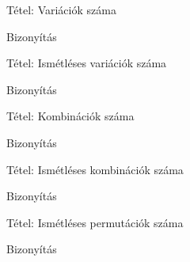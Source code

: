 \documentclass{beamer}
\begin{document}
\begin{frame}

\begin{block}{Tétel: Variációk száma}
\end{block}

\begin{block}{Bizonyítás}
\end{block}

\end{frame}

\begin{frame}

\begin{block}{Tétel: Ismétléses variációk száma}
\end{block}

\begin{block}{Bizonyítás}
\end{block}

\end{frame}

\begin{frame}

\begin{block}{Tétel: Kombinációk száma}
\end{block}

\begin{block}{Bizonyítás}
\end{block}

\end{frame}

\begin{frame}

\begin{block}{Tétel: Ismétléses kombinációk száma}
\end{block}

\begin{block}{Bizonyítás}
\end{block}

\end{frame}

\begin{frame}

\begin{block}{Tétel: Ismétléses permutációk száma}
\end{block}

\begin{block}{Bizonyítás}
\end{block}

\end{frame}
\end{document}
